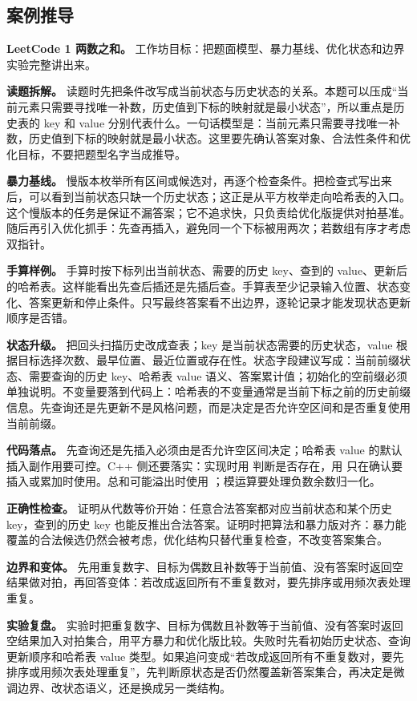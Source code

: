 \subsection{案例推导}

\noindent\textbf{LeetCode 1 两数之和。} 工作坊目标：把题面模型、暴力基线、优化状态和边界实验完整讲出来。

\textbf{读题拆解。} 读题时先把条件改写成当前状态与历史状态的关系。本题可以压成“当前元素只需要寻找唯一补数，历史值到下标的映射就是最小状态”，所以重点是历史表的 key 和 value 分别代表什么。一句话模型是：当前元素只需要寻找唯一补数，历史值到下标的映射就是最小状态。这里要先确认答案对象、合法性条件和优化目标，不要把题型名字当成推导。

\textbf{暴力基线。} 慢版本枚举所有区间或候选对，再逐个检查条件。把检查式写出来后，可以看到当前状态只缺一个历史状态；这正是从平方枚举走向哈希表的入口。这个慢版本的任务是保证不漏答案；它不追求快，只负责给优化版提供对拍基准。随后再引入优化抓手：先查再插入，避免同一个下标被用两次；若数组有序才考虑双指针。

\textbf{手算样例。} 手算时按下标列出当前状态、需要的历史 key、查到的 value、更新后的哈希表。这样能看出先查后插还是先插后查。手算表至少记录输入位置、状态变化、答案更新和停止条件。只写最终答案看不出边界，逐轮记录才能发现状态更新顺序是否错。

\textbf{状态升级。} 把回头扫描历史改成查表；key 是当前状态需要的历史状态，value 根据目标选择次数、最早位置、最近位置或存在性。状态字段建议写成：当前前缀状态、需要查询的历史 key、哈希表 value 语义、答案累计值；初始化的空前缀必须单独说明。不变量要落到代码上：哈希表的不变量通常是当前下标之前的历史前缀信息。先查询还是先更新不是风格问题，而是决定是否允许空区间和是否重复使用当前前缀。

\textbf{代码落点。} 先查询还是先插入必须由是否允许空区间决定；哈希表 value 的默认插入副作用要可控。C++ 侧还要落实：实现时用  判断是否存在，用  只在确认要插入或累加时使用。总和可能溢出时使用 ；模运算要处理负数余数归一化。

\textbf{正确性检查。} 证明从代数等价开始：任意合法答案都对应当前状态和某个历史 key，查到的历史 key 也能反推出合法答案。证明时把算法和暴力版对齐：暴力能覆盖的合法候选仍然会被考虑，优化结构只替代重复检查，不改变答案集合。

\textbf{边界和变体。} 先用重复数字、目标为偶数且补数等于当前值、没有答案时返回空结果做对拍，再回答变体：若改成返回所有不重复数对，要先排序或用频次表处理重复。

\textbf{实验复盘。} 实验时把重复数字、目标为偶数且补数等于当前值、没有答案时返回空结果加入对拍集合，用平方暴力和优化版比较。失败时先看初始历史状态、查询更新顺序和哈希表 value 类型。如果追问变成“若改成返回所有不重复数对，要先排序或用频次表处理重复”，先判断原状态是否仍然覆盖新答案集合，再决定是微调边界、改状态语义，还是换成另一类结构。

